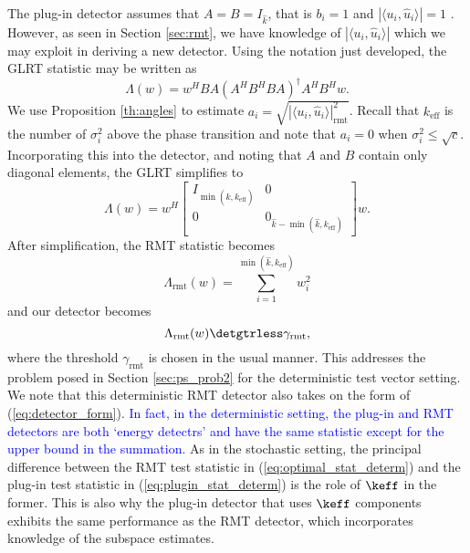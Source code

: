 The plug-in detector assumes that $A=B=I_{\widehat{k}}$, that is $b_i=1$ and $|\langle u_i,\widehat{u}_i\rangle|=1$ . However, as seen in Section \ref{sec:rmt}, we have knowledge of $|\langle u_i,\widehat{u}_i\rangle|$ which we may exploit in deriving a new detector. Using the notation just developed, the GLRT statistic may be written as
\begin{equation*}
\Lambda(w)=w^HBA(A^HB^HBA)^{\dagger}A^HB^Hw.
\end{equation*}
We use Proposition \ref{th:angles} to estimate $a_i=\sqrt{|\langle u_i,\widehat{u}_i\rangle|^2_{\text{rmt}}}$. Recall that $k_\text{eff}$ is the number of $\sigma_i^2$ above the phase transition and note that $a_i=0$ when $\sigma_i^2\leq\sqrt{c}$. Incorporating this into the detector, and noting that $A$ and $B$ contain only diagonal elements, the GLRT simplifies to
\begin{equation*}
\Lambda(w)=w^H\left[\begin{array}{cc} I_{\min(\widehat{k},k_\text{eff})} & 0 \\ 0 & 0_{\widehat{k}-\min(\widehat{k},k_\text{eff})}\end{array}\right]w.
\end{equation*}
After simplification, the RMT statistic becomes
\begin{equation}\label{eq:optimal_stat_determ}
\boxed{\Lambda_{\text{rmt}}(w) = \sum_{i=1}^{\min(\widehat{k},k_\text{eff})}w_i^2}
\end{equation}
and our detector becomes
\begin{equation}\label{eq:optimal_class_determ}
{\Lambda_{\text{rmt}}(w) \detgtrless \gamma_{\text{rmt}}},
\end{equation}
where the threshold $\gamma_{\text{rmt}}$ is chosen in the usual manner. This addresses the problem posed in Section \ref{sec:ps_prob2} for the deterministic test vector setting.  We note that this deterministic RMT detector also takes on the form of (\ref{eq:detector_form}). \textcolor{blue}{In fact, in the deterministic setting, the plug-in and RMT detectors are both `energy detectrs' and have the same statistic except for the upper bound in the summation.} As in the stochastic setting, the principal difference between the RMT test statistic in (\ref{eq:optimal_stat_determ}) and the plug-in test statistic in (\ref{eq:plugin_stat_determ}) is the role of $\keff$ in the former. This is also why the plug-in detector that uses $\keff$ components exhibits the same performance as the RMT detector, which incorporates knowledge of the subspace estimates. 

